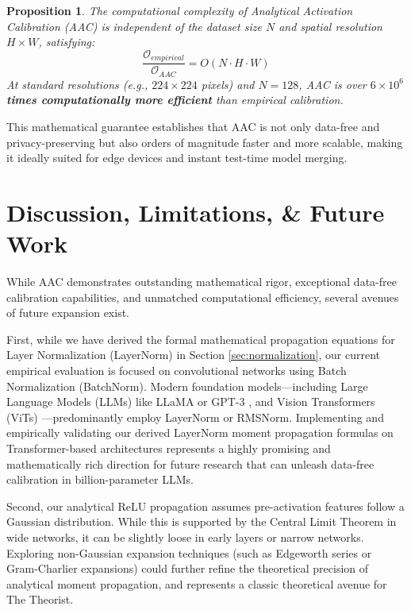 \documentclass{article}
\theoremstyle{plain}
\newtheorem{proposition}[theorem]{Proposition}
\theoremstyle{definition}
\theoremstyle{remark}
\begin{document}
\begin{proposition}
The computational complexity of Analytical Activation Calibration (AAC) is independent of the dataset size $N$ and spatial resolution $H \times W$, satisfying:
\begin{equation}
    \frac{\mathcal{O}_{empirical}}{\mathcal{O}_{AAC}} = O(N \cdot H \cdot W)
\end{equation}
At standard resolutions (e.g., $224 \times 224$ pixels) and $N=128$, AAC is over \textbf{$6 \times 10^6$ times computationally more efficient} than empirical calibration.
\end{proposition}

This mathematical guarantee establishes that AAC is not only data-free and privacy-preserving but also orders of magnitude faster and more scalable, making it ideally suited for edge devices and instant test-time model merging.
\fi

\section{Discussion, Limitations, \& Future Work}
\label{sec:discussion}

While AAC demonstrates outstanding mathematical rigor, exceptional data-free calibration capabilities, and unmatched computational efficiency, several avenues of future expansion exist.

First, while we have derived the formal mathematical propagation equations for Layer Normalization (LayerNorm) in Section \ref{sec:normalization}, our current empirical evaluation is focused on convolutional networks using Batch Normalization (BatchNorm). Modern foundation models—including Large Language Models (LLMs) like LLaMA \cite{touvron2023llama} or GPT-3 \cite{brown2020language}, and Vision Transformers (ViTs) \cite{caron2021emerging,radford2021learning}—predominantly employ LayerNorm or RMSNorm. Implementing and empirically validating our derived LayerNorm moment propagation formulas on Transformer-based architectures represents a highly promising and mathematically rich direction for future research that can unleash data-free calibration in billion-parameter LLMs.

Second, our analytical ReLU propagation assumes pre-activation features follow a Gaussian distribution. While this is supported by the Central Limit Theorem in wide networks, it can be slightly loose in early layers or narrow networks. Exploring non-Gaussian expansion techniques (such as Edgeworth series or Gram-Charlier expansions) could further refine the theoretical precision of analytical moment propagation, and represents a classic theoretical avenue for The Theorist.
\end{document}
